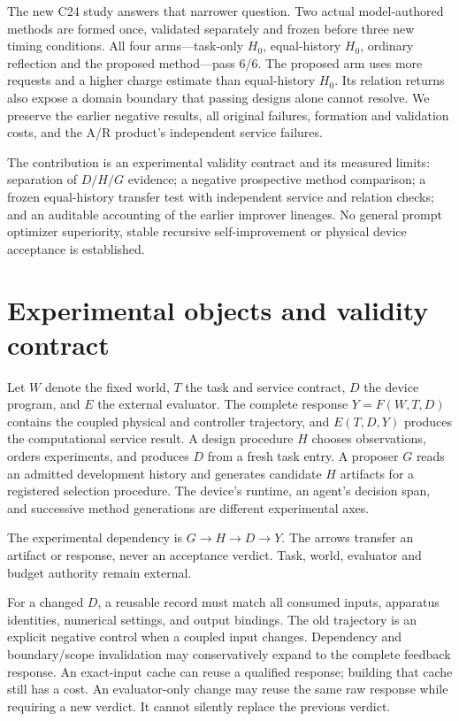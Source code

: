 The new C24 study answers that narrower question. Two actual model-authored
methods are formed once, validated separately and frozen before three new timing
conditions. All four arms---task-only $H_0$, equal-history $H_0$, ordinary reflection
and the proposed method---pass 6/6. The proposed arm uses more requests and a
higher charge estimate than equal-history $H_0$. Its relation returns also
expose a domain boundary that passing designs alone cannot resolve. We preserve
the earlier negative results, all original failures, formation and validation
costs, and the A/R product's independent service failures.

The contribution is an experimental validity contract and its measured limits:
separation of $D/H/G$ evidence; a negative prospective method comparison; a
frozen equal-history transfer test with independent service and relation checks;
and an auditable accounting of the earlier improver lineages. No general prompt
optimizer superiority, stable recursive self-improvement or physical device
acceptance is established.

\section{Experimental objects and validity contract}
Let $W$ denote the fixed world, $T$ the task and service contract, $D$ the device
program, and $E$ the external evaluator. The complete response
$Y=F(W,T,D)$ contains the coupled physical and controller trajectory, and
$E(T,D,Y)$ produces the computational service result. A design procedure $H$
chooses observations, orders experiments, and produces $D$ from a fresh task
entry. A proposer $G$ reads an admitted development history and generates
candidate $H$ artifacts for a registered selection procedure. The device's
runtime, an agent's decision span, and successive method generations are
different experimental axes.

The experimental dependency is $G\rightarrow H\rightarrow D\rightarrow Y$.
The arrows transfer an artifact or response, never an acceptance verdict.
Task, world, evaluator and budget authority remain external.


For a changed $D$, a reusable record must match all consumed inputs, apparatus
identities, numerical settings, and output bindings. The old trajectory is an
explicit negative control when a coupled input changes. Dependency and
boundary/scope invalidation may conservatively expand to the complete feedback
response. An exact-input cache can reuse a qualified response; building that
cache still has a cost. An evaluator-only change may reuse the same raw response
while requiring a new verdict. It cannot silently replace the previous verdict.

